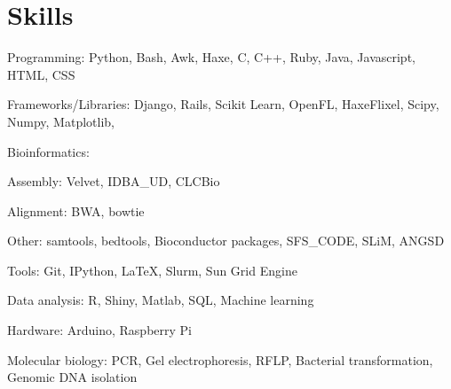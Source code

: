 \documentclass[letterpaper]{article}
\renewenvironment{itemize}{
  \begin{list}{}{
    \setlength{\leftmargin}{1.5em}
  }
}{
  \end{list}
}
\begin{document}
\section*{Skills}
\begin{itemize}
\item Programming: Python, Bash, Awk, Haxe, C, C++, Ruby, Java, Javascript, HTML, CSS
\item Frameworks/Libraries: Django, Rails, Scikit Learn, OpenFL, HaxeFlixel, Scipy, Numpy, Matplotlib, 
\item Bioinformatics:
	\begin{itemize}
	\item Assembly: Velvet, IDBA\_UD, CLCBio
	\item Alignment: BWA, bowtie
	\item Other: samtools, bedtools, Bioconductor packages, SFS\_CODE, SLiM, ANGSD
	\end{itemize} 
\item Tools: Git, IPython, LaTeX, Slurm, Sun Grid Engine
\item Data analysis: R, Shiny, Matlab, SQL, Machine learning
\item Hardware: Arduino, Raspberry Pi
\item Molecular biology: PCR, Gel electrophoresis, RFLP, Bacterial transformation, Genomic DNA isolation
\end{itemize}

\end{document}
